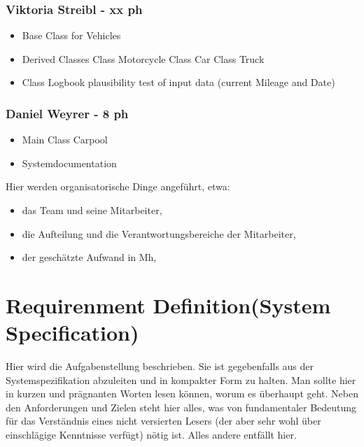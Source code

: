 \subsubsection{Viktoria Streibl - xx ph}
\begin{itemize}
	\item Base Class for Vehicles
	\item Derived Classes
		\subitem Class Motorcycle
		\subitem Class Car
		\subitem Class Truck
	\item Class Logbook
		\subitem plausibility test of input data (current Mileage and Date)
\end{itemize}


\subsubsection{Daniel Weyrer - 8 ph}
\begin{itemize}
	\item Main Class Carpool
	\item Systemdocumentation
\end{itemize}


Hier werden organisatorische Dinge angeführt, etwa:
\begin{itemize}
	\item das Team und seine Mitarbeiter,
	\item die Aufteilung und die Verantwortungsbereiche der Mitarbeiter,
	\item der geschätzte Aufwand in Mh,
\end{itemize}




\section{Requirenment Definition(System Specification)}

Hier wird die Aufgabenstellung beschrieben. Sie ist gegebenfalls aus der Systemspezifikation abzuleiten und in kompakter Form zu halten. Man sollte hier in kurzen und
prägnanten Worten lesen können, worum es überhaupt geht. Neben den Anforderungen und Zielen steht hier alles, was von fundamentaler Bedeutung für das Verständnis
eines nicht versierten Lesers (der aber sehr wohl über einschlägige Kenntnisse verfügt) nötig ist. Alles andere entfällt hier.

